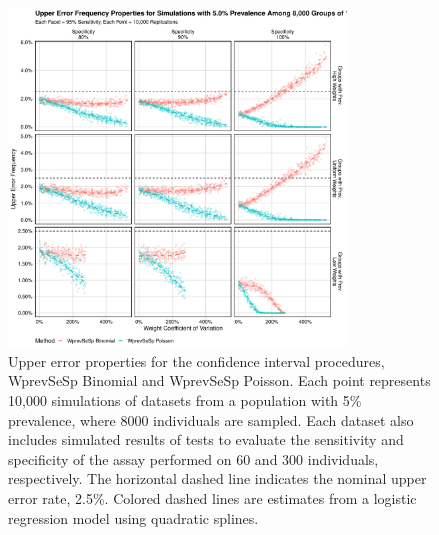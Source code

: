 \begin{figure}
\centering
\includegraphics[width=0.8\textwidth]{imperfect_upper_error_frequency_8000_groups_0_05_prev}
\caption{Upper error properties for the confidence interval procedures, WprevSeSp Binomial and WprevSeSp Poisson.
Each point represents 10,000 simulations of datasets from a population with 5\% prevalence, where 8000 individuals are sampled.
Each dataset also includes simulated results of tests to evaluate the sensitivity and specificity of the assay performed on 60 and 300 individuals, respectively.
The horizontal dashed line indicates the nominal upper error rate, 2.5\%.
Colored dashed lines are estimates from a logistic regression model using quadratic splines.}
\label{ch_3:fig:imperfect_upper_error_frequency_8000_groups_0_05_prev}
\end{figure}

